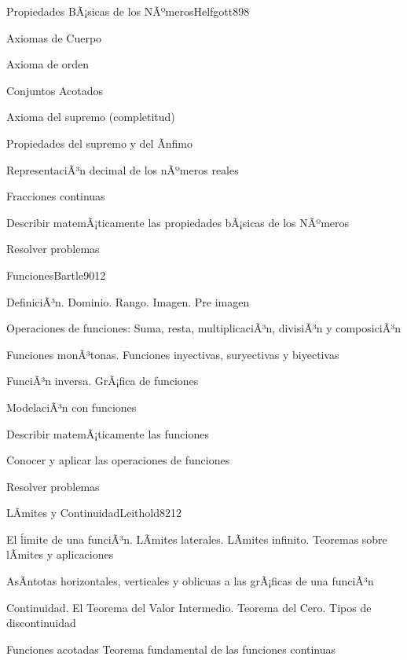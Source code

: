 \begin{syllabus}
\begin{unit}{Propiedades BÃ¡sicas de los NÃºmeros}{Helfgott89}{8}
\begin{topics}
	\item Axiomas de Cuerpo
	\item Axioma de orden
	\item Conjuntos Acotados
	\item Axioma del supremo  (completitud)
	\item Propiedades del supremo y del Ã­nfimo
	\item RepresentaciÃ³n decimal de los nÃºmeros reales
	\item Fracciones continuas
\end{topics}
\begin{unitgoals}
	\item Describir matemÃ¡ticamente las propiedades bÃ¡sicas de los NÃºmeros
	\item Resolver problemas
\end{unitgoals}
\end{unit}

\begin{unit}{Funciones}{Bartle90}{12}
\begin{topics}
      \item DefiniciÃ³n. Dominio. Rango. Imagen. Pre imagen
      \item Operaciones de funciones: Suma, resta, multiplicaciÃ³n, divisiÃ³n y composiciÃ³n
      \item Funciones monÃ³tonas. Funciones inyectivas,  suryectivas y biyectivas
      \item FunciÃ³n inversa. GrÃ¡fica de funciones
      \item ModelaciÃ³n con funciones
\end{topics}

   \begin{unitgoals}
      \item Describir matemÃ¡ticamente las funciones
      \item Conocer y aplicar las operaciones de funciones
	\item Resolver problemas
   \end{unitgoals}
\end{unit}

\begin{unit}{LÃ­mites y Continuidad}{Leithold82}{12}
\begin{topics}
      \item El \'limite de una funciÃ³n. LÃ­mites laterales. LÃ­mites  infinito. Teoremas sobre lÃ­mites y aplicaciones
      \item AsÃ­ntotas horizontales, verticales y oblicuas a las grÃ¡ficas de una funciÃ³n
      \item Continuidad. El Teorema del Valor Intermedio. Teorema del Cero. Tipos de discontinuidad
      \item Funciones acotadas Teorema fundamental de las funciones continuas
	\end{topics}


\end{unit}
\end{syllabus}
